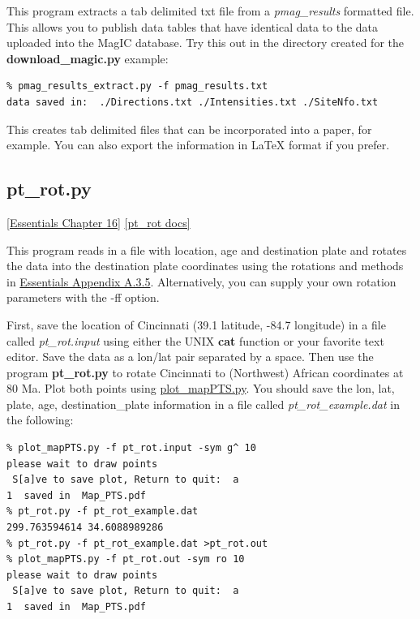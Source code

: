 \documentclass[11pt]{book}
\begin{document}
{{{This program extracts a tab delimited txt file from a {\it pmag\_results} formatted file.   This allows you to publish data tables that have identical data to the data uploaded into the MagIC database.    Try this out in the directory created for the {\bf download\_magic.py} example:

\begin{verbatim}
% pmag_results_extract.py -f pmag_results.txt
data saved in:  ./Directions.txt ./Intensities.txt ./SiteNfo.txt
\end{verbatim}

This creates tab delimited files that can be incorporated into a paper, for example.   You can also export the information in LaTeX format if you prefer. 




\subsection{pt\_rot.py}
\href{http://magician.ucsd.edu/Essentials_2/WebBook2ch16.html#ch16}{[Essentials Chapter 16]}
\href{http://earthref.org/PmagPy/pmagpydocs/pt_rot-module.html}{[pt\_rot docs]}

This program reads in a file with location, age and destination plate and rotates the data into the destination plate coordinates using the rotations and methods in \href{http://magician.ucsd.edu/Essentials_2/WebBook2ap1.html#polerot}{Essentials Appendix A.3.5}.  Alternatively, you can supply your own rotation parameters with the -ff option.     

First, save  the location of Cincinnati (39.1 latitude, -84.7 longitude) in a file called {\it pt\_rot.input} using either the UNIX {\bf cat} function or your favorite text editor.  Save the data as a lon/lat pair separated by a space.  Then use the program {\bf pt\_rot.py} to rotate Cincinnati to (Northwest) African coordinates at 80 Ma.  Plot both points using \href{#plot_mapPTS.py}{plot\_mapPTS.py}.   You should save the lon, lat, plate, age, destination\_plate information in a file called {\it pt\_rot\_example.dat} in the following: 

\begin{verbatim}
% plot_mapPTS.py -f pt_rot.input -sym g^ 10
please wait to draw points
 S[a]ve to save plot, Return to quit:  a
1  saved in  Map_PTS.pdf
% pt_rot.py -f pt_rot_example.dat 
299.763594614 34.6088989286
% pt_rot.py -f pt_rot_example.dat >pt_rot.out
% plot_mapPTS.py -f pt_rot.out -sym ro 10
please wait to draw points
 S[a]ve to save plot, Return to quit:  a
1  saved in  Map_PTS.pdf
\end{verbatim}

}}}
\end{document}

